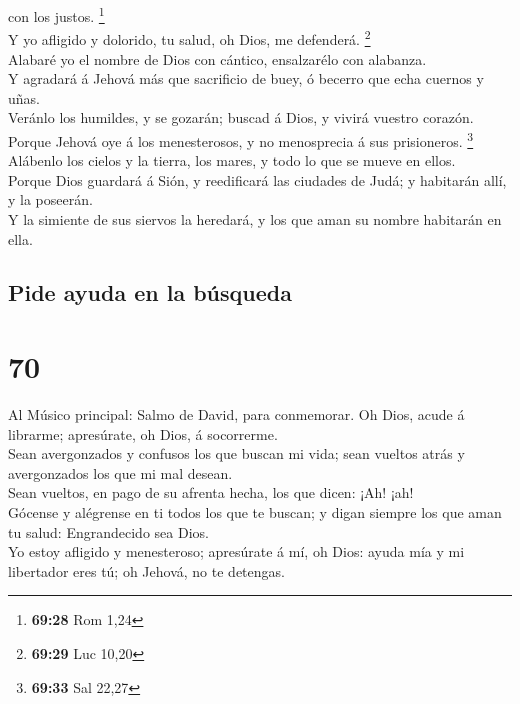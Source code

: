 con los justos. \footnote{\textbf{69:28} Rom 1,24}\\
 Y yo afligido y dolorido, tu salud, oh Dios, me defenderá.
\footnote{\textbf{69:29} Luc 10,20}\\
 Alabaré yo el nombre de Dios con cántico, ensalzarélo con
alabanza.\\
 Y agradará á Jehová más que sacrificio de buey, ó becerro
que echa cuernos y uñas.\\
 Veránlo los humildes, y se gozarán; buscad á Dios, y
vivirá vuestro corazón.\\
 Porque Jehová oye á los menesterosos, y no menosprecia á
sus prisioneros. \footnote{\textbf{69:33} Sal 22,27}\\
 Alábenlo los cielos y la tierra, los mares, y todo lo que
se mueve en ellos.\\
 Porque Dios guardará á Sión, y reedificará las ciudades de
Judá; y habitarán allí, y la poseerán.\\
 Y la simiente de sus siervos la heredará, y los que aman
su nombre habitarán en ella.

\hypertarget{pide-ayuda-en-la-buxfasqueda}{%
\subsection{Pide ayuda en la
búsqueda}\label{pide-ayuda-en-la-buxfasqueda}}

\hypertarget{section-69}{%
\section{70}\label{section-69}}

 Al Músico principal: Salmo de David, para conmemorar. Oh
Dios, acude á librarme; apresúrate, oh Dios, á socorrerme.\\
 Sean avergonzados y confusos los que buscan mi vida; sean
vueltos atrás y avergonzados los que mi mal desean.\\
 Sean vueltos, en pago de su afrenta hecha, los que dicen:
¡Ah! ¡ah!\\
 Gócense y alégrense en ti todos los que te buscan; y digan
siempre los que aman tu salud: Engrandecido sea Dios.\\
 Yo estoy afligido y menesteroso; apresúrate á mí, oh Dios:
ayuda mía y mi libertador eres tú; oh Jehová, no te detengas.

